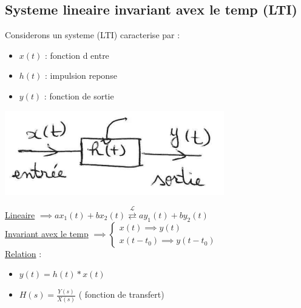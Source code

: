 \documentclass[12pt]{book}
\newcommand{\lagrange}{\mathcal{L}}
\begin{document}
            \subsection{Systeme lineaire invariant avex le temp (LTI)}
               \begin{center}
                    \begin{minipage}{0.49\linewidth}
                        Considerons un systeme (LTI) caracterise par :
                        \begin{itemize}
                            \item $x(t) $ : fonction d entre 
                            \item $h(t) $ : impulsion reponse 
                            \item $y(t) $ : fonction de sortie
                        \end{itemize}
                    \end{minipage}
                    \begin{minipage}{0.49\linewidth}
                        
                        \includegraphics[width = \linewidth]{pic/LTI.png}
                    \end{minipage}
               \end{center}
                \underline{Lineaire} $\implies ax_1(t) + bx_2(t)\overset{\lagrange}{\rightleftarrows}ay_1(t) + by_2(t)$ \\
                \underline{Invariant avex le temp} $\implies \begin{cases}
                    x(t) \implies y(t) \\x(t-t_0) \implies y(t-t_0)
                \end{cases}$ \\
                \underline{Relation} :\begin{itemize}
                    \item $y(t) = h(t)*x(t)$
                    \item $H(s) = \frac{Y(s)}{X(s)}$ ( fonction de transfert)
                \end{itemize}
\end{document}
